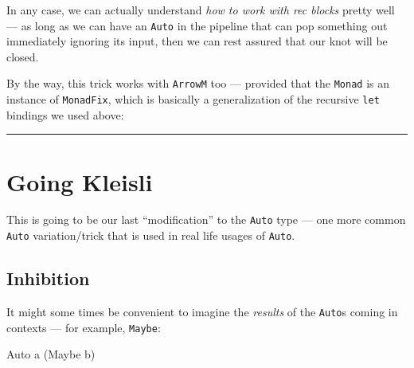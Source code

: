 \documentclass[]{article}
\newenvironment{Shaded}{}{}
\newcommand{\KeywordTok}[1]{\textcolor[rgb]{0.00,0.44,0.13}{\textbf{{#1}}}}
\newcommand{\DataTypeTok}[1]{\textcolor[rgb]{0.56,0.13,0.00}{{#1}}}
\newcommand{\CommentTok}[1]{\textcolor[rgb]{0.38,0.63,0.69}{\textit{{#1}}}}
\newcommand{\OtherTok}[1]{\textcolor[rgb]{0.00,0.44,0.13}{{#1}}}
\newcommand{\FunctionTok}[1]{\textcolor[rgb]{0.02,0.16,0.49}{{#1}}}
\newcommand{\NormalTok}[1]{{#1}}
\begin{document}
In any case, we can actually understand \emph{how to work with rec
blocks} pretty well --- as long as we can have an \texttt{Auto} in the
pipeline that can pop something out immediately ignoring its input, then
we can rest assured that our knot will be closed.

By the way, this trick works with \texttt{ArrowM} too --- provided that
the \texttt{Monad} is an instance of \texttt{MonadFix}, which is
basically a generalization of the recursive \texttt{let} bindings we
used above:

\begin{Shaded}
\end{Shaded}

\begin{center}\rule{0.5\linewidth}{\linethickness}\end{center}

\section{Going Kleisli}\label{going-kleisli}

This is going to be our last ``modification'' to the \texttt{Auto} type
--- one more common \texttt{Auto} variation/trick that is used in real
life usages of \texttt{Auto}.

\subsection{Inhibition}\label{inhibition}

It might some times be convenient to imagine the \emph{results} of the
\texttt{Auto}s coming in contexts --- for example, \texttt{Maybe}:

\begin{Shaded}
\begin{Highlighting}[]
\DataTypeTok{Auto} \NormalTok{a (}\DataTypeTok{Maybe} \NormalTok{b)}
\end{Highlighting}
\end{Shaded}
\end{document}

